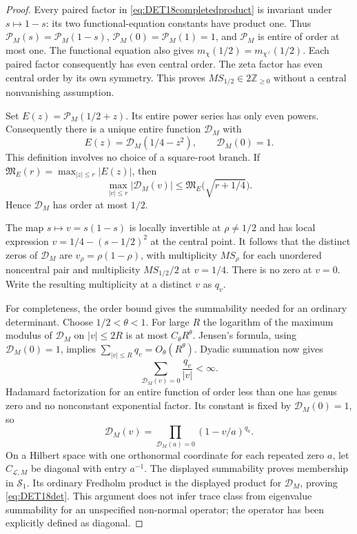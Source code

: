 \begin{proof}
Every paired factor in \eqref{eq:DET18completedproduct} is invariant
under $s\mapsto1-s$: its two functional-equation constants have product
one. Thus $\mathscr P_M(s)=\mathscr P_M(1-s)$,
$\mathscr P_M(0)=\mathscr P_M(1)=1$, and $\mathscr P_M$ is entire of
order at most one. The functional equation also gives
$m_{\chi}(1/2)=m_{\chi^\vee}(1/2)$. Each paired factor consequently
has even central order. The zeta factor has even central order by its
own symmetry. This proves $MS_{1/2}\in2\mathbb Z_{\ge0}$ without a
central nonvanishing assumption.

Set $E(z)=\mathscr P_M(1/2+z)$. Its entire power series has only even
powers. Consequently there is a unique entire function $\mathscr D_M$
with
\[
 E(z)=\mathscr D_M(1/4-z^2),\qquad \mathscr D_M(0)=1.
\]
This definition involves no choice of a square-root branch. If
$\mathfrak M_E(r)=\max_{|z|\le r}|E(z)|$, then
\[
 \max_{|v|\le r}|\mathscr D_M(v)|
 \le \mathfrak M_E\bigl(\sqrt{r+1/4}\bigr).
\]
Hence $\mathscr D_M$ has order at most $1/2$.

The map $s\mapsto v=s(1-s)$ is locally invertible at
$\rho\ne1/2$ and has local expression $v=1/4-(s-1/2)^2$ at the
central point. It follows that the distinct zeros of $\mathscr D_M$
are $v_\rho=\rho(1-\rho)$, with multiplicity $MS_\rho$ for each
unordered noncentral pair and multiplicity $MS_{1/2}/2$ at $v=1/4$.
There is no zero at $v=0$. Write the resulting multiplicity at a
distinct $v$ as $q_v$.

For completeness, the order bound gives the summability needed for an
ordinary determinant. Choose $1/2<\theta<1$. For large $R$ the
logarithm of the maximum modulus of $\mathscr D_M$ on $|v|\le2R$
is at most $C_\theta R^\theta$. Jensen's formula, using
$\mathscr D_M(0)=1$, implies
$\sum_{|v|\le R}q_v=O_\theta(R^\theta)$.
Dyadic summation now gives
\[
 \sum_{\mathscr D_M(v)=0}\frac{q_v}{|v|}<\infty.
\]
Hadamard factorization for an entire function of order less than one
has genus zero and no nonconstant exponential factor. Its constant
is fixed by $\mathscr D_M(0)=1$, so
\[
 \mathscr D_M(v)=\prod_{\mathscr D_M(a)=0}
 (1-v/a)^{q_a}.
\]
On a Hilbert space with one orthonormal coordinate for each repeated
zero $a$, let $C_{\mathcal L,M}$ be diagonal with entry $a^{-1}$.
The displayed summability proves membership in $\mathcal S_1$.
Its ordinary Fredholm product is the displayed product for
$\mathscr D_M$, proving \eqref{eq:DET18det}. This argument does not
infer trace class from eigenvalue summability for an unspecified
non-normal operator; the operator has been explicitly defined as
diagonal.


\end{proof}
